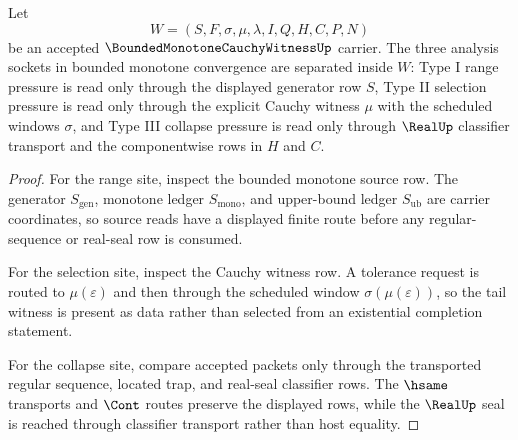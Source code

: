 \begin{theorem}
\label{thm:bounded-monotone-cauchy-witness-socket-separation}
Let
$$
W=(S,F,\sigma,\mu,\lambda,I,Q,H,C,P,N)
$$
be an accepted $\BoundedMonotoneCauchyWitnessUp$ carrier. The three analysis sockets in bounded monotone convergence are separated inside $W$: Type I range pressure is read only through the displayed generator row $S$, Type II selection pressure is read only through the explicit Cauchy witness $\mu$ with the scheduled windows $\sigma$, and Type III collapse pressure is read only through $\RealUp$ classifier transport and the componentwise rows in $H$ and $C$.
\end{theorem}
\begin{proof}
For the range site, inspect the bounded monotone source row. The generator $S_{\mathrm{gen}}$, monotone ledger $S_{\mathrm{mono}}$, and upper-bound ledger $S_{\mathrm{ub}}$ are carrier coordinates, so source reads have a displayed finite route before any regular-sequence or real-seal row is consumed.

For the selection site, inspect the Cauchy witness row. A tolerance request is routed to $\mu(\varepsilon)$ and then through the scheduled window $\sigma(\mu(\varepsilon))$, so the tail witness is present as data rather than selected from an existential completion statement.

For the collapse site, compare accepted packets only through the transported regular sequence, located trap, and real-seal classifier rows. The $\hsame$ transports and $\Cont$ routes preserve the displayed rows, while the $\RealUp$ seal is reached through classifier transport rather than host equality.
\end{proof}

